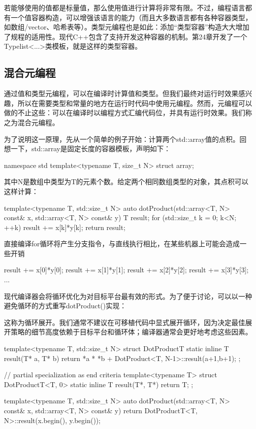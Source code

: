 若能够使用的值都是标量值，那么使用值进行计算将非常有限。不过，编程语言都有一个值容器构造，可以增强该语言的能力（而且大多数语言都有各种容器类型，如数组/vector、哈希表等）。类型元编程也是如此：添加“类型容器”构造大大增加了规程的适用性。现代C++包含了支持开发这种容器的机制。第24章开发了一个Typelist<...>类模板，就是这样的类型容器。

\subsection{混合元编程}

通过值和类型元编程，可以在编译时计算值和类型。但我们最终对运行时效果感兴趣，所以在需要类型和常量的地方在运行时代码中使用元编程。然而，元编程可以做的不止这些：可以在编译时以编程方式汇编代码位，并具有运行时效果。我们称之为混合元编程。

为了说明这一原理，先从一个简单的例子开始：计算两个std::array值的点积。回想一下，std::array是固定长度的容器模板，声明如下：

\begin{cpp}
namespace std {
	template<typename T, size_t N> struct array;
}
\end{cpp}

其中N是数组中类型为T的元素个数。给定两个相同数组类型的对象，其点积可以这样计算：

\begin{cpp}
template<typename T, std::size_t N>
auto dotProduct(std::array<T, N> const& x, std::array<T, N> const& y)
{
	T result{};
	for (std::size_t k = 0; k<N; ++k) {
		result += x[k]*y[k];
	}
	return result;
}
\end{cpp}

直接编译for循环将产生分支指令，与直线执行相比，在某些机器上可能会造成一些开销

\begin{cpp}
result += x[0]*y[0];
result += x[1]*y[1];
result += x[2]*y[2];
result += x[3]*y[3];
...
\end{cpp}

现代编译器会将循环优化为对目标平台最有效的形式。为了便于讨论，可以以一种避免循环的方式重写dotProduct()实现：

\begin{notice}
这称为循环展开。我们通常不建议在可移植代码中显式展开循环，因为决定最佳展开策略的细节高度依赖于目标平台和循环体；编译器通常会更好地考虑这些因素。
\end{notice}

\begin{cpp}
template<typename T, std::size_t N>
struct DotProductT {
	static inline T result(T* a, T* b) {
		return *a * *b + DotProduct<T, N-1>::result(a+1,b+1);
	}
};

// partial specialization as end criteria
template<typename T>
struct DotProductT<T, 0> {
	static inline T result(T*, T*) {
		return T{};
	}
};

template<typename T, std::size_t N>
auto dotProduct(std::array<T, N> const& x,
				std::array<T, N> const& y)
{
	return DotProductT<T, N>::result(x.begin(), y.begin());
}
\end{cpp}

